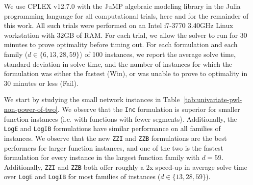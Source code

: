 \documentclass[opre,nonblindrev]{informs3} %
\newcommand{\ZZB}{\texttt{ZZB}}
\newcommand{\ZZI}{\texttt{ZZI}}
\newcommand{\Log}{\texttt{LogE}}
\newcommand{\LogIB}{\texttt{LogIB}}
\newcommand{\Inc}{\texttt{Inc}}
\begin{document}
We use CPLEX v12.7.0 with the JuMP algebraic modeling library \citep{Dunning:2015a} in the Julia programming language \citep{Bezanson:2017} for all computational trials, here and for the remainder of this work. All such trials were performed on an Intel i7-3770 3.40GHz Linux workstation with 32GB of RAM. For each trial, we allow the solver to run for 30 minutes to prove optimality before timing out. For each formulation and each family ($d \in \{6,13,28,59\}$) of 100 instances, we report the average solve time, standard deviation in solve time, and the number of instances for which the formulation was either the fastest (Win), or was unable to prove to optimality in 30 minutes or less (Fail).

We start by studying the small network instances in Table~\ref{tab:univariate-pwl-non-power-of-two}.
We observe that the \Inc{} formulation is superior for smaller function instances (i.e. with functions with fewer segments). Additionally, the \Log{} and \LogIB{} formulations have similar performance on all families of instances. We observe that the new \ZZI{} and \ZZB{} formulations are the best performers for larger function instances, and one of the two is the fastest formulation for every instance in the largest function family with $d=59$. Additionally, \ZZI{} and \ZZB{} both offer roughly a 2x speed-up in average solve time over \Log{} and \LogIB{} for most families of instances ($d \in \{13,28,59\}$).

\end{document}
